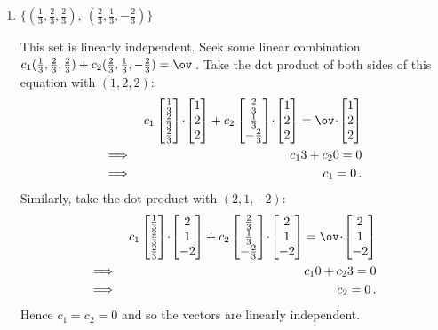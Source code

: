 \begin{example}
\begin{enumerate}
\item \(\{(\frac13,\frac23,\frac23),\ (\frac23,\frac13,-\frac23)\}\)
\begin{solution} 
This set is linearly independent.
Seek some linear combination \(c_1(\frac13,\frac23,\frac23) +c_2(\frac23,\frac13,-\frac23) =\ov\)\,.
Take the dot product of both sides of this equation with \((1,2,2)\):
\begin{eqnarray*}
&&c_1\begin{bmatrix}\frac13\\\frac23\\\frac23 \end{bmatrix}\cdot\begin{bmatrix} 1\\2\\2 \end{bmatrix} +c_2\begin{bmatrix} \frac23\\\frac13\\-\frac23 \end{bmatrix}\cdot\begin{bmatrix} 1\\2\\2 \end{bmatrix} =\ov\cdot\begin{bmatrix} 1\\2\\2 \end{bmatrix}
\\\implies&& c_13+c_20=0
\\\implies&& c_1=0\,.
\end{eqnarray*}
Similarly, take the dot product with \((2,1,-2)\): 
\begin{eqnarray*}
&&c_1\begin{bmatrix}\frac13\\\frac23\\\frac23 \end{bmatrix}\cdot\begin{bmatrix} 2\\1\\-2 \end{bmatrix} +c_2\begin{bmatrix} \frac23\\\frac13\\-\frac23 \end{bmatrix}\cdot\begin{bmatrix} 2\\1\\-2 \end{bmatrix} =\ov\cdot\begin{bmatrix} 2\\1\\-2 \end{bmatrix}
\\\implies&& c_10+c_23=0
\\\implies&& c_2=0\,.
\end{eqnarray*}
Hence \(c_1=c_2=0\) and so the vectors are linearly independent.
\end{solution}


\end{enumerate}
\end{example}
